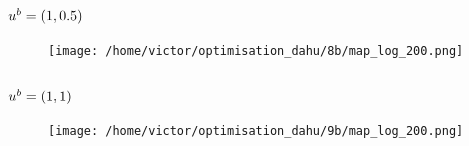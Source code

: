 \documentclass[../../Main_ManuscritThese.tex]{subfiles}
\begin{document}
\subsection*{$u^b=(1, 0.5)$}
\begin{figure}[ht]
  \centering
  \texttt{[image: /home/victor/optimisation\_dahu/8b/map\_log\_200.png]}
\end{figure}
\begin{figure}[ht]
  \centering
    \resizebox{1\textwidth}{!}{}
\end{figure}
\clearpage
\subsection*{$u^b=(1, 1)$}
\begin{figure}[ht]
  \centering
  \texttt{[image: /home/victor/optimisation\_dahu/9b/map\_log\_200.png]}
\end{figure}
\begin{figure}[ht]
  \centering
  \resizebox{1\textwidth}{!}{}
\end{figure}
\clearpage

\markchapterend


\pagestyle{appendixStyle}



\subfileLocal{
	\pagestyle{empty}
	
	

}

\endgroup
\end{document}
